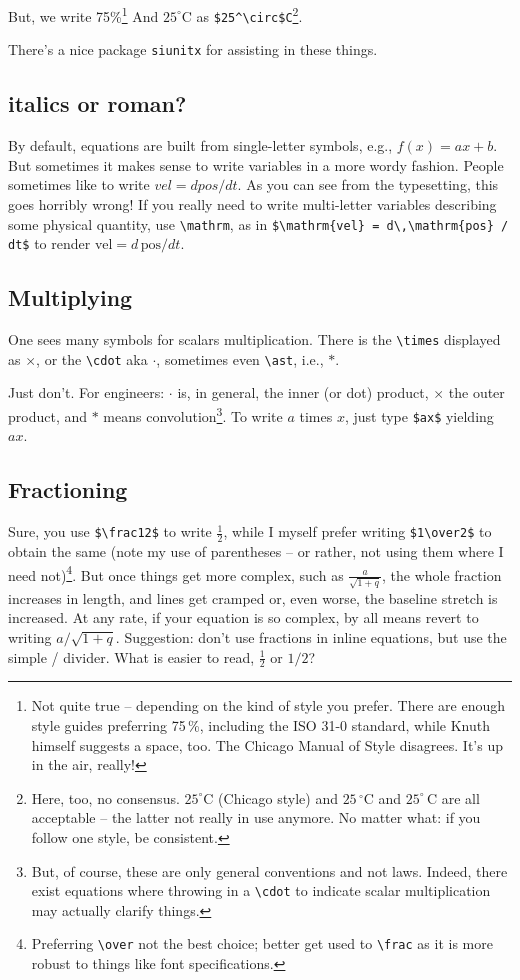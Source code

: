 \documentclass{article}
\begin{document}
But, we write 75\%\footnote{Not quite true -- depending on the kind of style you prefer.  There are enough style guides preferring 75\,\%, including the ISO 31-0 standard, while Knuth himself suggests a space, too.  The Chicago Manual of Style disagrees.  It's up in the air, really!} And $25^\circ$C as \verb+$25^\circ$C+\footnote{Here, too, no consensus.  $25^\circ$C (Chicago style) and $25\,^\circ$C and $25^\circ\,$C are all acceptable -- the latter not really in use anymore.  No matter what: if you follow one style, be consistent.}.

There's a nice package \texttt{siunitx} for assisting in these things. 

\subsection{italics or roman?}
By default, equations are built from single-letter symbols, e.g., $f(x) = ax+b$.  But sometimes it makes sense to write variables in a more wordy fashion.  People sometimes like to write $vel = d pos / d t$.  As you can see from the typesetting, this goes horribly wrong!  If you really need to write multi-letter variables describing some physical quantity, use \verb+\mathrm+, as in \verb+$\mathrm{vel} = d\,\mathrm{pos} / dt$+ to render $\mathrm{vel} = d\, \mathrm{pos} / dt$.

\subsection{Multiplying}
One sees many symbols for scalars multiplication.  There is the \verb+\times+ displayed as $\times$, or the \verb+\cdot+ aka $\cdot$, sometimes even \verb+\ast+, i.e., $\ast$.

Just don't.  For engineers: $\cdot$ is, in general, the inner (or dot) product, $\times$ the  outer product, and $\ast$ means convolution\footnote{But, of course, these are only general conventions and not laws.  Indeed, there exist equations where throwing in a \verb+\cdot+ to indicate scalar multiplication may actually clarify things.}. To write $a$ times $x$, just type \verb+$ax$+ yielding $ax$.


\subsection{Fractioning}
Sure, you use \verb+$\frac12$+ to write $\frac12$, while I myself prefer writing \verb+$1\over2$+ to obtain the same (note my use of parentheses -- or rather, not using them where I need not)\footnote{Preferring \verb+\over+ not the best choice; better get used to \verb+\frac+ as it is more robust to things like font specifications.}.  But once things get more complex, such as $\frac a{\sqrt{1+q}}$, the whole fraction increases in length, and lines get cramped or, even worse, the baseline stretch is increased. At any rate, if your equation is so complex, by all means revert to writing $a/{\sqrt{1+q}}$.   Suggestion: don't use fractions in inline equations, but use the simple / divider.  What is easier to read, $\frac12$ or $1/2$?
\end{document}
